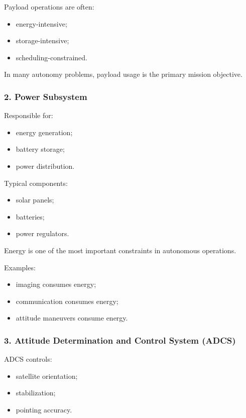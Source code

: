 \documentclass[10pt,a4paper,twocolumn]{article}
\begin{document}
Payload operations are often:
\begin{itemize}
    \item energy-intensive;
    \item storage-intensive;
    \item scheduling-constrained.
\end{itemize}

\begin{keybox}
    In many autonomy problems, payload usage is the primary mission objective.
\end{keybox}


\subsubsection*{2. Power Subsystem}

Responsible for:
\begin{itemize}
    \item energy generation;
    \item battery storage;
    \item power distribution.
\end{itemize}

Typical components:
\begin{itemize}
    \item solar panels;
    \item batteries;
    \item power regulators.
\end{itemize}

Energy is one of the most important constraints in autonomous operations.

Examples:
\begin{itemize}
    \item imaging consumes energy;
    \item communication consumes energy;
    \item attitude maneuvers consume energy.
\end{itemize}


\subsubsection*{3. Attitude Determination and Control System (ADCS)}

ADCS controls:
\begin{itemize}
    \item satellite orientation;
    \item stabilization;
    \item pointing accuracy.
\end{itemize}
\end{document}
